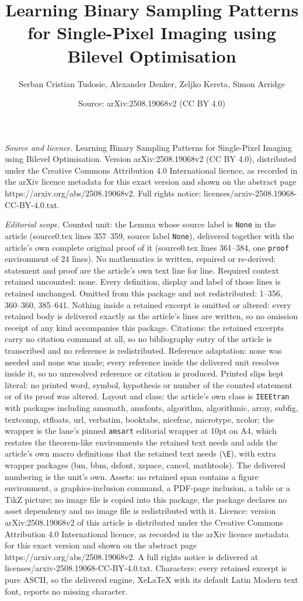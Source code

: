 \documentclass[10pt,a4paper]{amsart}
\title[Learning Binary Sampling Patterns for Single-Pixel Imaging u]{Learning Binary Sampling Patterns for Single-Pixel Imaging using Bilevel Optimisation}
\author{Serban Cristian Tudosie, Alexander Denker, Zeljko Kereta, Simon Arridge}
\date{Source: arXiv:2508.19068v2 (CC BY 4.0)}
\begin{document}
\maketitle

\noindent\emph{Source and licence.} Learning Binary Sampling Patterns for Single-Pixel Imaging using Bilevel Optimisation. Version arXiv:2508.19068v2 (CC BY 4.0), distributed under the Creative Commons Attribution 4.0 International licence, as recorded in the arXiv licence metadata for this exact version and shown on the abstract page https://arxiv.org/abs/2508.19068v2. Full rights notice: licenses/arxiv-2508.19068-CC-BY-4.0.txt.\par\smallskip

\noindent\textit{Editorial scope.} Counted unit: the Lemma whose source label is \texttt{None} in the article (source0.tex lines 357--359, source label \texttt{None}), delivered together with the article's own complete original proof of it (source0.tex lines 361--384, one \texttt{proof} environment of 24 lines). No mathematics is written, repaired or re-derived: statement and proof are the article's own text line for line. Required context retained uncounted: none. Every definition, display and label of those lines is retained unchanged. Omitted from this package and not redistributed: 1--356, 360--360, 385--641. Nothing inside a retained excerpt is omitted or altered: every retained body is delivered exactly as the article's lines are written, so no omission receipt of any kind accompanies this package. Citations: the retained excerpts carry no citation command at all, so no bibliography entry of the article is transcribed and no reference is redistributed. Reference adaptation: none was needed and none was made; every reference inside the delivered unit resolves inside it, so no unresolved reference or citation is produced. Printed slips kept literal: no printed word, symbol, hypothesis or number of the counted statement or of its proof was altered. Layout and class: the article's own class is \texttt{IEEEtran} with packages including amsmath, amsfonts, algorithm, algorithmic, array, subfig, textcomp, stfloats, url, verbatim, booktabs, nicefrac, microtype, xcolor; the wrapper is the lane's pinned \texttt{amsart} editorial wrapper at 10pt on A4, which restates the theorem-like environments the retained text needs and adds the article's own macro definitions that the retained text needs (\texttt{\textbackslash E}), with extra wrapper packages (bm, bbm, dsfont, xspace, cancel, mathtools). The delivered numbering is the unit's own. Assets: no retained span contains a figure environment, a graphics-inclusion command, a PDF-page inclusion, a table or a TikZ picture; no image file is copied into this package, the package declares no asset dependency and no image file is redistributed with it. Licence: version arXiv:2508.19068v2 of this article is distributed under the Creative Commons Attribution 4.0 International licence, as recorded in the arXiv licence metadata for this exact version and shown on the abstract page https://arxiv.org/abs/2508.19068v2. A full rights notice is delivered at licenses/arxiv-2508.19068-CC-BY-4.0.txt. Characters: every retained excerpt is pure ASCII, so the delivered engine, XeLaTeX with its default Latin Modern text font, reports no missing character.
\end{document}
